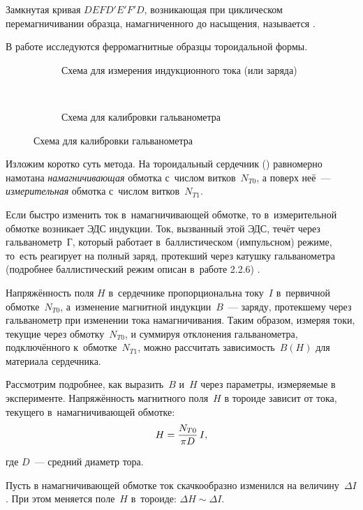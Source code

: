 Замкнутая кривая $DEFD'E'F'D$, возникающая при циклическом перемагничивании образца, намагниченного до насыщения,
называется .

В работе исследуются ферромагнитные образцы тороидальной формы.

\begin{figure}
	\centering
	\begin{subfigure}[b]{0.48\textwidth}
		\caption{Схема для измерения индукционного тока (или заряда)}
	\end{subfigure}
	~
	\begin{subfigure}[b]{0.48\textwidth}
		\caption{Схема для калибровки гальванометра}
	\end{subfigure}
\end{figure}

Изложим коротко суть метода. На тороидальный сердечник () равномерно намотана \emph{намагничивающая} обмотка
с~числом витков~$N_{T0}$, а поверх неё~--- \emph{измерительная} обмотка с~числом витков~$N_{T1}$.

Если быстро изменить ток в~намагничивающей обмотке, то в~измерительной обмотке возникает ЭДС индукции. Ток, вызванный
этой ЭДС, течёт через гальванометр~Г, который работает в~баллистическом (импульсном) режиме, то~есть реагирует на полный
заряд, протекший через катушку гальванометра (подробнее баллистический режим описан в~работе 2.2.6) .

Напряжённость поля $H$ в~сердечнике пропорциональна току~$I$ в~первичной обмотке~$N_{T0}$, а~изменение магнитной
индукции~$B$~--- заряду, протекшему через гальванометр при изменении тока намагничивания. Таким образом, измеряя токи,
текущие через обмотку~$N_{T0}$, и суммируя отклонения гальванометра, подключённого к~обмотке~$N_{T1}$, можно рассчитать
зависимость~$B(H)$ для материала сердечника.

Рассмотрим подробнее, как выразить~$B$ и~$H$ через параметры, измеряемые в эксперименте. Напряжённость магнитного
поля~$H$ в тороиде зависит от тока, текущего в~намагничивающей обмотке:
\begin{equation}
	\eqmark{2}
	H=\frac{N_{T0}}{\pi D}\,I,
\end{equation}

где $D$~--- средний диаметр тора.

Пусть в намагничивающей обмотке ток скачкообразно изменился на величину~$\Delta I$. При этом меняется поле~$H$ в~тороиде:
$\Delta H\sim\Delta I$.

